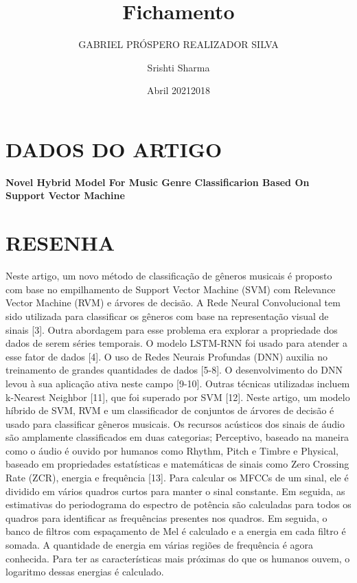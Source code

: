 \documentclass{article}
\title{Fichamento}
\author{GABRIEL PRÓSPERO REALIZADOR  SILVA}
\date{Abril 2021}
\begin{document}
\maketitle

\section{DADOS DO ARTIGO}
\textbf{Novel Hybrid Model For Music Genre Classificarion Based On Support Vector Machine﻿ \\}
\author{Srishti Sharma \\}
\date{2018}

\section{RESENHA}
Neste artigo, um novo método de classificação de gêneros musicais é proposto com base no empilhamento de Support Vector Machine (SVM) com Relevance Vector Machine (RVM) e árvores de decisão.
A Rede Neural Convolucional tem sido utilizada para classificar os gêneros com base na representação visual de sinais [3].
Outra abordagem para esse problema era explorar a propriedade dos dados de serem séries temporais. O modelo LSTM-RNN foi usado para atender a esse fator de dados [4]. O uso de Redes Neurais Profundas (DNN) auxilia no treinamento de grandes quantidades de dados [5-8]. O desenvolvimento do DNN levou à sua aplicação ativa neste campo [9-10]. Outras técnicas utilizadas incluem k-Nearest Neighbor [11], que foi superado por SVM [12]. Neste artigo, um modelo híbrido de SVM, RVM e um classificador de conjuntos de árvores de decisão é usado para classificar gêneros musicais.
Os recursos acústicos dos sinais de áudio são amplamente classificados em duas categorias; Perceptivo, baseado na maneira como o áudio é ouvido por humanos como Rhythm, Pitch e Timbre e Physical, baseado em propriedades estatísticas e matemáticas de sinais como Zero Crossing Rate (ZCR), energia e frequência [13].
Para calcular os MFCCs de um sinal, ele é dividido em vários quadros curtos para manter o sinal constante. Em seguida, as estimativas do periodograma do espectro de potência são calculadas para todos os quadros para identificar as frequências presentes nos quadros. Em seguida, o banco de filtros com espaçamento de Mel é calculado e a energia em cada filtro é somada. A quantidade de energia em várias regiões de frequência é agora conhecida. Para ter as características mais próximas do que os humanos ouvem, o logaritmo dessas energias é calculado.
\end{document}
